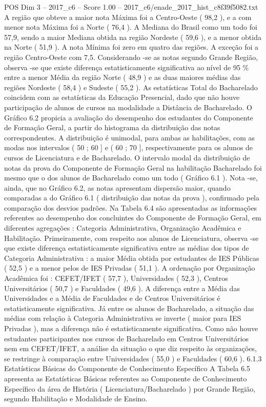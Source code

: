 \begin{textsample}{POS Dim 3 – 2017\_c6 – Score 1.00 – 2017\_c6/enade\_2017\_hist\_c8f39f5082.txt}
A região que obteve a maior nota Máxima foi a Centro-Oeste ( 98,2 ), e a com menor nota Máxima foi a Norte ( 76,4 ).
A Mediana do Brasil como um todo foi 57,9, sendo a maior Mediana obtida na região Nordeste ( 59,6 ), e a menor obtida na Norte ( 51,9 ).
A nota Mínima foi zero em quatro das regiões.
A exceção foi a região Centro-Oeste com 7,5.
Considerando -se as notas segundo Grande Região, observa -se que existe diferença estatisticamente significativa ao nível de 95 \% entre a menor Média da região Norte ( 48,9 ) e as duas maiores médias das regiões Nordeste ( 58,4 ) e Sudeste ( 55,2 ).
As estatísticas Total do Bacharelado coincidem com as estatísticas da Educação Presencial, dado que não houve participação de alunos de cursos na modalidade a Distância de Bacharelado.
O Gráfico 6.2 propicia a avaliação do desempenho dos estudantes do Componente de Formação Geral, a partir do histograma da distribuição das notas correspondentes.
A distribuição é unimodal, para ambas as habilitações, com as modas nos intervalos ( 50 ; 60 ] e ( 60 ; 70 ], respectivamente para os alunos de cursos de Licenciatura e de Bacharelado.
O intervalo modal da distribuição de notas da prova do Componente de Formação Geral na habilitação Bacharelado foi mesmo que o dos alunos de Bacharelado como um todo ( Gráfico 6.1 ).
Nota -se, ainda, que no Gráfico 6.2, as notas apresentam dispersão maior, quando comparadas a do Gráfico 6.1 ( distribuição das notas da prova ), confirmado pela comparação dos desvios padrões.
Na Tabela 6.4 são apresentadas as informações referentes ao desempenho dos concluintes do Componente de Formação Geral, em diferentes agregações : Categoria Administrativa, Organização Acadêmica e Habilitação.
Primeiramente, com respeito aos alunos de Licenciatura, observa -se que existe diferença estatisticamente significativa entre as médias dos tipos de Categoria Administrativa : a maior Média obtida por estudantes de IES Públicas ( 52,5 ) e a menor pelos de IES Privadas ( 51,1 ).
A ordenação por Organização Acadêmica foi : CEFET/IFET ( 57,7 ), Universidades ( 52,3 ), Centros Universitários ( 50,7 ) e Faculdades ( 49,6 ).
A diferença entre a Média das Universidades e a Média de Faculdades e de Centros Universitários é estatisticamente significativa.
Já entre os alunos de Bacharelado, a situação das médias com relação à Categoria Administrativa se inverte ( maior para IES Privadas ), mas a diferença não é estatisticamente significativa.
Como não houve estudantes participantes nos cursos de Bacharelado em Centros Universitários nem em CEFET/IFET, a análise da situação o que diz respeito às organizações, se restringe à comparação entre Universidades ( 55,0 ) e Faculdades ( 60,6 ). 6.1.3 Estatísticas Básicas do Componente de Conhecimento Específico A Tabela 6.5 apresenta as Estatísticas Básicas referentes ao Componente de Conhecimento Específico da área de História ( Licenciatura/Bacharelado ) por Grande Região, segundo Habilitação e Modalidade de Ensino.

\end{textsample}

